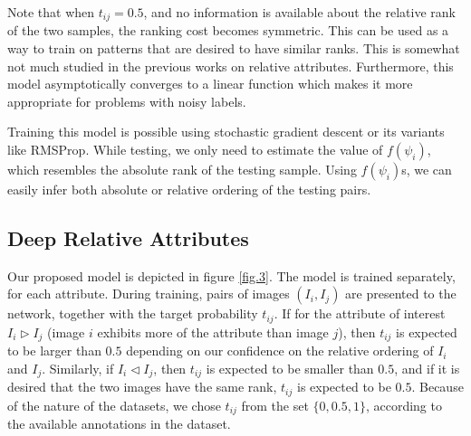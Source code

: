 Note that when $t_{ij} = 0.5$, and no information is available about the relative rank of the two samples, the ranking cost becomes symmetric. This can be used as a way to train on patterns that are desired to have similar ranks. This is somewhat not much studied in the previous works on relative attributes.
Furthermore, this model asymptotically converges to a linear function which makes it more appropriate for problems with noisy labels. %

Training this model is possible using stochastic gradient descent or its variants like RMSProp.
While testing, we only need to estimate the value of $f(\psi_i)$, which resembles the absolute rank of the testing sample. Using $f(\psi_i)$s, we can easily infer both absolute or relative ordering of the testing pairs.


\subsection{Deep Relative Attributes}\label{sec3.2}


Our proposed model is depicted in figure \ref{fig.3}. The model is trained separately, for each attribute. During training, pairs of images $(I_i, I_j)$ are presented to the network, together with the target probability $t_{ij}$. If for the attribute of interest $I_i \triangleright I_j$ (image $i$ exhibits more of the attribute than image $j$), then $t_{ij}$ is expected to be larger than $0.5$ depending on our confidence on the relative ordering of $I_i$ and $I_j$. Similarly, if $I_i \triangleleft I_j$, then $t_{ij}$ is expected to be smaller than $0.5$, and if it is desired that the two images have the same rank, $t_{ij}$ is expected to be $0.5$. Because of the nature of the datasets, we chose $t_{ij}$ from the set $\{0, 0.5, 1 \}$, according to the available annotations in the dataset.


